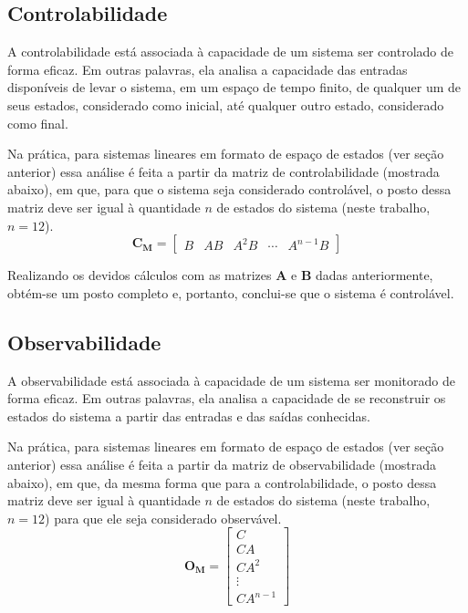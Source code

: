 \subsection{Controlabilidade}
A controlabilidade está associada à capacidade de um sistema ser controlado de forma eficaz. Em outras palavras, ela 
analisa a capacidade das entradas disponíveis de levar o sistema, em um espaço de tempo finito, de qualquer um de seus 
estados, considerado como inicial, até qualquer outro estado, considerado como final.

Na prática, para sistemas lineares em formato de espaço de estados (ver seção anterior) essa análise é feita a 
partir da matriz de controlabilidade (mostrada abaixo), em que, para que o sistema 
seja considerado controlável, o posto dessa matriz deve ser igual à quantidade $n$ de estados do sistema (neste trabalho, 
$n=12$).
\begin{equation*}
    \mathbf{C_M} = \begin{bmatrix}
    B & AB & A^2B & \cdots & A^{n-1}B
    \end{bmatrix}
\end{equation*}

Realizando os devidos cálculos com as matrizes $\mathbf{A}$ e $\mathbf{B}$ dadas anteriormente, obtém-se um posto 
completo e, portanto, conclui-se que o sistema é controlável.

\subsection{Observabilidade}
A observabilidade está associada à capacidade de um sistema ser monitorado de forma eficaz. Em outras palavras, ela 
analisa a capacidade de se reconstruir os estados do sistema a partir das entradas e das saídas conhecidas.

Na prática, para sistemas lineares em formato de espaço de estados (ver seção anterior) essa análise é feita a 
partir da matriz de observabilidade (mostrada abaixo), em que, da mesma forma que para a controlabilidade, 
o posto dessa matriz deve ser igual à quantidade $n$ de estados do sistema (neste trabalho, 
$n=12$) para que ele seja considerado observável.
\begin{equation*}
    \mathbf{O_M} = \begin{bmatrix}
    C \\
    CA \\
    CA^2 \\
    \vdots \\
    CA^{n-1}
    \end{bmatrix}
\end{equation*}

